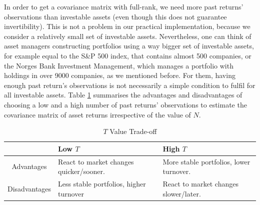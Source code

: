 	In order to get a covariance matrix with full-rank, we need more past returns' observations than investable assets (even though this does not guarantee invertibility). This is not a problem in our practical implementation, because we consider a relatively small set of investable assets. Nevertheless, one can think of asset managers constructing portfolios using a way bigger set of investable assets, for example equal to the S\&P 500 index, that contains almost 500 companies, or the Norges Bank Investment Management, which manages a portfolio with holdings in over 9000 companies, as we mentioned before. For them, having enough past return's observations is not necessarily a simple condition to fulfil for all investable assets. Table \ref{tab:tvaluetradeoff} summarises the advantages and disadvantages of choosing a low and a high number of past returns' observations to estimate the covariance matrix of asset returns irrespective of the value of $N$.
	
	

    \begin{table}[h!]
        \centering
        \begin{tabularx}{\textwidth}{c|XX}
             & \textbf{Low $T$} & \textbf{High $T$} \\
	         \hline
            Advantages & React to market changes quicker/sooner. & More stable portfolios, lower turnover. \\
            Disadvantages & Less stable portfolios, higher turnover & React to market changes slower/later.
        \end{tabularx}
        \caption{$T$ Value Trade-off}
	    \label{tab:tvaluetradeoff}
    \end{table} 
	
